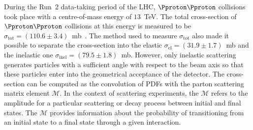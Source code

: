 During the Run~2 data-taking period of the LHC, $\Pproton\Pproton$ collisions took place with a centre-of-mass 
energy of $13$~TeV. The total cross-section of $\Pproton\Pproton$ collisions at this energy is measured to 
be $\sigma_{\text{tot}} = (110.6 \pm 3.4)$~mb~\cite{Cafagna:2021sge}. The method used to measure $\sigma_{\text{tot}}$ also made it 
possible to separate the cross-section into the elastic $\sigma_{\text{el}} = (31.9 \pm 1.7)$~mb and 
the inelastic one $\sigma_{\text{inel}} = (79.5 \pm 1.8)$~mb.
However, only inelastic scattering generates particles with a sufficient angle with respect to the beam 
axis so that these particles enter into the geometrical acceptance of the detector. 
The cross-section can be computed as the convolution of PDFs with the parton 
scattering matrix element $\mathcal{M}$. 
In the context of scattering experiments, the $\mathcal{M}$ refers to the amplitude 
for a particular scattering or decay process between initial and final states. 
The $\mathcal{M}$ provides information about the probability of transitioning 
from an initial state to a final state through a given interaction.








